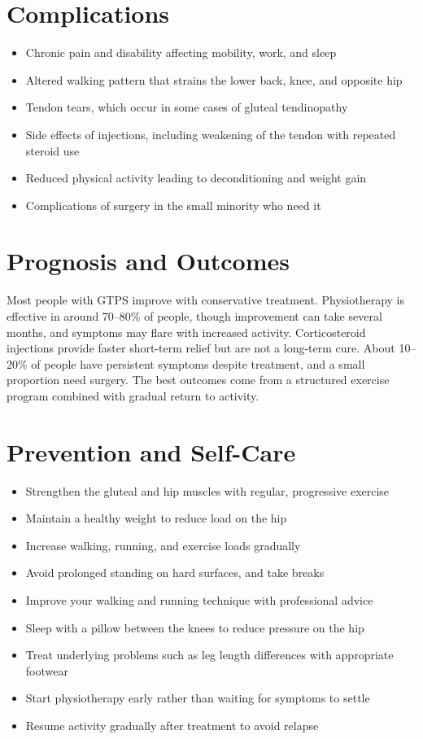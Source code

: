 \section*{Complications}
\begin{itemize}
    \item Chronic pain and disability affecting mobility, work, and sleep
    \item Altered walking pattern that strains the lower back, knee, and opposite hip
    \item Tendon tears, which occur in some cases of gluteal tendinopathy
    \item Side effects of injections, including weakening of the tendon with repeated steroid use
    \item Reduced physical activity leading to deconditioning and weight gain
    \item Complications of surgery in the small minority who need it
\end{itemize}

\section*{Prognosis and Outcomes}
Most people with GTPS improve with conservative treatment. Physiotherapy is effective in around 70--80\% of people, though improvement can take several months, and symptoms may flare with increased activity. Corticosteroid injections provide faster short-term relief but are not a long-term cure. About 10--20\% of people have persistent symptoms despite treatment, and a small proportion need surgery. The best outcomes come from a structured exercise program combined with gradual return to activity.

\section*{Prevention and Self-Care}
\begin{itemize}
    \item Strengthen the gluteal and hip muscles with regular, progressive exercise
    \item Maintain a healthy weight to reduce load on the hip
    \item Increase walking, running, and exercise loads gradually
    \item Avoid prolonged standing on hard surfaces, and take breaks
    \item Improve your walking and running technique with professional advice
    \item Sleep with a pillow between the knees to reduce pressure on the hip
    \item Treat underlying problems such as leg length differences with appropriate footwear
    \item Start physiotherapy early rather than waiting for symptoms to settle
    \item Resume activity gradually after treatment to avoid relapse
\end{itemize}

